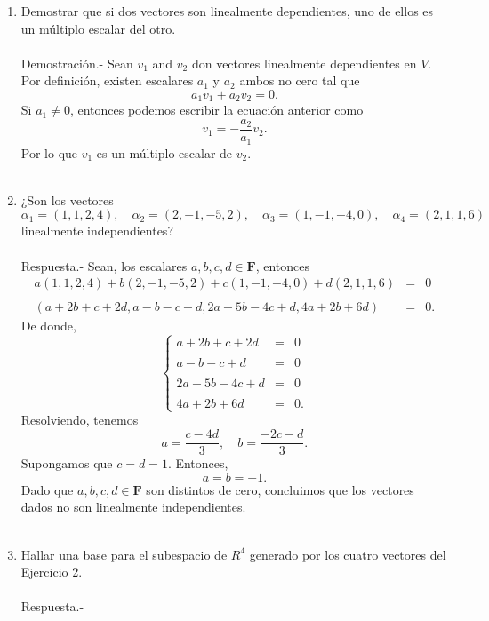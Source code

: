 \begin{enumerate}[\bfseries 1.]

    \item Demostrar que si dos vectores son linealmente dependientes, uno de ellos es un múltiplo escalar del otro.\\\\
	Demostración.-\; Sean $v_1$ and $v_2$ don vectores linealmente dependientes en $V$. Por definición, existen escalares $a_1$ y $a_2$ ambos no cero tal que
	$$a_1v_1+a_2v_2=0.$$
	Si $a_1\neq 0$, entonces podemos escribir la ecuación anterior como
	$$v_1=-\frac{a_2}{a_1}v_2.$$
	Por lo que $v_1$ es un múltiplo escalar de $v_2$.\\\\

    \item ¿Son los vectores
    $$\alpha_1=(1,1,2,4),\quad \alpha_2=(2,-1,-5,2),\quad \alpha_3=(1,-1,-4,0),\quad \alpha_4=(2,1,1,6)$$
    linealmente independientes?\\\\
	Respuesta.-\; Sean, los escalares $a,b,c,d\in \textbf{F}$, entonces
	$$
	\begin{array}{rcl}
	    a(1,1,2,4)+b(2,-1,-5,2)+c(1,-1,-4,0)+d(2,1,1,6) &=& 0\\\\
	    (a+2b+c+2d,a-b-c+d,2a-5b-4c+d,4a+2b+6d) &=& 0.
	\end{array}
	$$
	De donde,
	$$
	\left\{
	    \begin{array}{rcl}
		a+2b+c+2d &=& 0\\\\
		a-b-c+d &=& 0\\\\
		2a-5b-4c+d &=& 0\\\\
		4a+2b+6d &=& 0.
	    \end{array}
	\right.
	$$
	Resolviendo, tenemos 
	$$a=\dfrac{c-4d}{3},\quad b=\dfrac{-2c-d}{3}.$$
	Supongamos que $c=d=1$. Entonces, 
	$$a=b=-1.$$
	Dado que $a,b,c,d\in \textbf{F}$ son distintos de cero, concluimos que los vectores dados no son linealmente independientes.\\\\ 

    \item Hallar una base para el subespacio de $R^4$ generado por los cuatro vectores del Ejercicio 2.\\\\
	Respuesta.-\; 

\end{enumerate}

